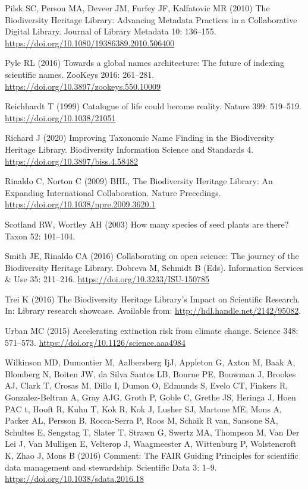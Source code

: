 \documentclass[
]{article}
\newlength{\cslhangindent}
\newlength{\cslentryspacingunit} %
\newenvironment{CSLReferences}[2] %
 {%
  \setlength{\parindent}{0pt}
  \ifodd #1
  \let\oldpar\par
  \def\par{\hangindent=\cslhangindent\oldpar}
  \fi
  \setlength{\parskip}{#2\cslentryspacingunit}
 }%
 {}
\begin{document}
\begin{CSLReferences}{1}{0}
\leavevmode{}%
Pilsk SC, Person MA, Deveer JM, Furfey JF, Kalfatovic MR (2010) {The
Biodiversity Heritage Library: Advancing Metadata Practices in a
Collaborative Digital Library}. Journal of Library Metadata 10:
136--155. \url{https://doi.org/10.1080/19386389.2010.506400}

\leavevmode{}%
Pyle RL (2016) {Towards a global names architecture: The future of
indexing scientific names}. ZooKeys 2016: 261--281.
\url{https://doi.org/10.3897/zookeys.550.10009}

\leavevmode{}%
Reichhardt T (1999) {Catalogue of life could become reality}. Nature
399: 519--519. \url{https://doi.org/10.1038/21051}

\leavevmode{}%
Richard J (2020) {Improving Taxonomic Name Finding in the Biodiversity
Heritage Library}. Biodiversity Information Science and Standards 4.
\url{https://doi.org/10.3897/biss.4.58482}

\leavevmode{}%
Rinaldo C, Norton C (2009) {BHL, The Biodiversity Heritage Library: An
Expanding International Collaboration}. Nature Precedings.
\url{https://doi.org/10.1038/npre.2009.3620.1}

\leavevmode{}%
Scotland RW, Wortley AH (2003) {How many species of seed plants are
there?} Taxon 52: 101--104.

\leavevmode{}%
Smith JE, Rinaldo CA (2016) {Collaborating on open science: The journey
of the Biodiversity Heritage Library}. Dobreva M, Schmidt B (Eds).
Information Services \& Use 35: 211--216.
\url{https://doi.org/10.3233/ISU-150785}

\leavevmode{}%
Trei K (2016) {The Biodiversity Heritage Library's Impact on Scientific
Research}. In: Library research showcase. Available from:
\url{http://hdl.handle.net/2142/95082}.

\leavevmode{}%
Urban MC (2015) {Accelerating extinction risk from climate change}.
Science 348: 571--573. \url{https://doi.org/10.1126/science.aaa4984}

\leavevmode{}%
Wilkinson MD, Dumontier M, Aalbersberg IjJ, Appleton G, Axton M, Baak A,
Blomberg N, Boiten JW, da Silva Santos LB, Bourne PE, Bouwman J, Brookes
AJ, Clark T, Crosas M, Dillo I, Dumon O, Edmunds S, Evelo CT, Finkers R,
Gonzalez-Beltran A, Gray AJG, Groth P, Goble C, Grethe JS, Heringa J,
Hoen PAC t, Hooft R, Kuhn T, Kok R, Kok J, Lusher SJ, Martone ME, Mons
A, Packer AL, Persson B, Rocca-Serra P, Roos M, Schaik R van, Sansone
SA, Schultes E, Sengstag T, Slater T, Strawn G, Swertz MA, Thompson M,
Van Der Lei J, Van Mulligen E, Velterop J, Waagmeester A, Wittenburg P,
Wolstencroft K, Zhao J, Mons B (2016) {Comment: The FAIR Guiding
Principles for scientific data management and stewardship}. Scientific
Data 3: 1--9. \url{https://doi.org/10.1038/sdata.2016.18}


\end{CSLReferences}
\end{document}
